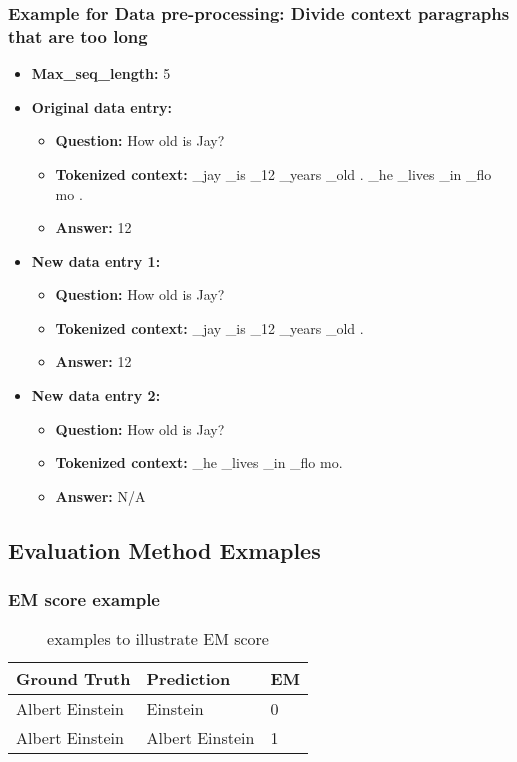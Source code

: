 \documentclass{article}
\begin{document}
\subsubsection{Example for Data pre-processing: Divide context paragraphs that are too long} \label{appendix_2}
\begin{itemize}
    \item \textbf{Max\_seq\_length:} 5
    \item \textbf{Original data entry:}
    \begin{itemize}
        \item \textbf{Question:} How old is Jay?
        \item \textbf{Tokenized context:} \_jay \_is \_12 \_years \_old . \_he \_lives \_in \_flo mo .
        \item \textbf{Answer:} 12
    \end{itemize}
    \item \textbf{New data entry 1:}
    \begin{itemize}
        \item \textbf{Question:} How old is Jay?
        \item \textbf{Tokenized context:} \_jay \_is \_12 \_years \_old .
        \item \textbf{Answer:} 12
    \end{itemize}
    \item \textbf{New data entry 2:}
    \begin{itemize}
        \item \textbf{Question:} How old is Jay?
        \item \textbf{Tokenized context:} \_he \_lives \_in \_flo mo.
        \item \textbf{Answer:} N/A
    \end{itemize}
\end{itemize}


\subsection{Evaluation Method Exmaples}
\label{Evaulation-score}
\subsubsection{EM score example}
\begin{table} [H]
\centering
\caption{examples to illustrate EM score}
\begin{tabular}{lll}
\toprule
\textbf{Ground Truth}& \textbf{Prediction} & \textbf{EM} \\ \midrule
Albert Einstein      & Einstein            & 0       \\
Albert Einstein      & Albert Einstein     & 1       \\ \bottomrule
\end{tabular}
\end{table}
\end{document}
